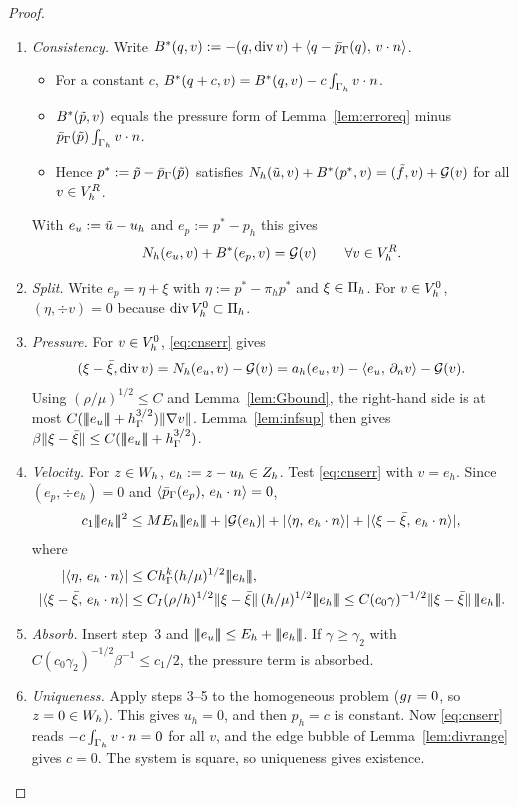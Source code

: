 \begin{proof}
\begin{enumerate}
\item \emph{Consistency.} Write $B^\ast(q,v):=-(q,\operatorname{div} v)+\langle q-\bar p_{\Gamma}(q),\, v\cdot n\rangle$.
\begin{itemize}
\item For a constant $c$, $B^\ast(q+c,v)=B^\ast(q,v)-c\int_{\Gamma_h}v\cdot n$.
\item $B^\ast(\tilde p,v)$ equals the pressure form of Lemma~\ref{lem:erroreq} minus $\bar p_{\Gamma}(\tilde p)\int_{\Gamma_h}v\cdot n$.
\item Hence $p^\ast:=\tilde p-\bar p_{\Gamma}(\tilde p)$ satisfies $N_h(\tilde u,v)+B^\ast(p^\ast,v)=(\tilde f,v)+\mathcal G(v)$ for all $v\in V_h^R$.
\end{itemize}
With $e_u:=\tilde u-u_h$ and $e_p:=p^\ast-p_h$ this gives
\begin{equation}\label{eq:cnserr}
N_h(e_u,v)+B^\ast(e_p,v)=\mathcal G(v)\qquad\forall v\in V_h^R .
\end{equation}
\item \emph{Split.} Write $e_p=\eta+\xi$ with $\eta:=p^\ast-\pi_hp^\ast$ and $\xi\in\Pi_h$. For $v\in V_h^0$, $(\eta,\div v)=0$ because $\operatorname{div}V_h^0\subset\Pi_h$.
\item \emph{Pressure.} For $v\in V_h^0$, \eqref{eq:cnserr} gives
\[
(\xi-\bar\xi,\operatorname{div} v)=N_h(e_u,v)-\mathcal G(v)=a_h(e_u,v)-\langle e_u,\, \partial_n v\rangle-\mathcal G(v).
\]
Using $(\rho/\mu)^{1/2}\le C$ and Lemma~\ref{lem:Gbound}, the right-hand side is at most $C(|\!|\!|e_u|\!|\!|+h_\Gamma^{3/2})\lVert \nabla v\rVert$. Lemma~\ref{lem:infsup} then gives $\beta\lVert \xi-\bar\xi\rVert\le C(|\!|\!|e_u|\!|\!|+h_\Gamma^{3/2})$.
\item \emph{Velocity.} For $z\in W_h$, $e_h:=z-u_h\in Z_h$. Test \eqref{eq:cnserr} with $v=e_h$. Since $(e_p,\div e_h)=0$ and $\langle \bar p_{\Gamma}(e_p),\, e_h\cdot n\rangle=0$,
\[
c_1\tnorm{e_h}^2\le ME_h\tnorm{e_h}+|\Gc(e_h)|+|\ip{\eta}{e_h\cdot n}|+|\ip{\xi-\bar\xi}{e_h\cdot n}|,
\]
where
\begin{align*}
|\ip{\eta}{e_h\cdot n}|&\le C\hG^k(h/\mu)^{1/2}\tnorm{e_h},\\
|\ip{\xi-\bar\xi}{e_h\cdot n}|&\le C_I(\rho/h)^{1/2}\norm{\xi-\bar\xi}\,(h/\mu)^{1/2}\tnorm{e_h}\le C(c_0\gamma)^{-1/2}\norm{\xi-\bar\xi}\,\tnorm{e_h}.
\end{align*}
\item \emph{Absorb.} Insert step~3 and $\tnorm{e_u}\le E_h+\tnorm{e_h}$. If $\gamma\ge\gamma_2$ with $C(c_0\gamma_2)^{-1/2}\beta^{-1}\le c_1/2$, the pressure term is absorbed.
\item \emph{Uniqueness.} Apply steps 3--5 to the homogeneous problem ($g_I=0$, so $z=0\in W_h$). This gives $u_h=0$, and then $p_h=c$ is constant. Now \eqref{eq:cnserr} reads $-c\int_{\Gamma_h}v\cdot n=0$ for all $v$, and the edge bubble of Lemma~\ref{lem:divrange} gives $c=0$. The system is square, so uniqueness gives existence.\qedhere
\end{enumerate}
\end{proof}

